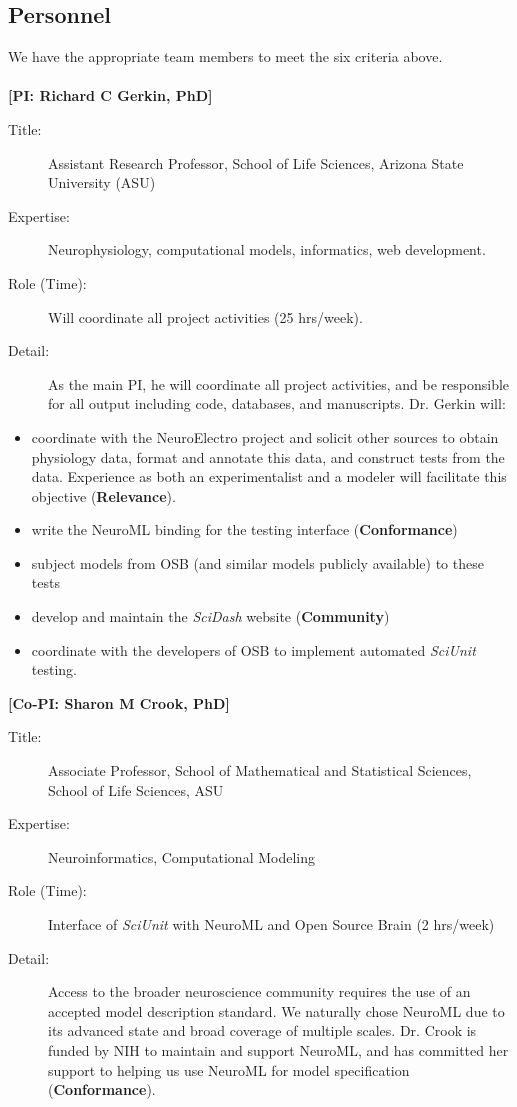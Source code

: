\documentclass[11pt,letterpaper]{article}
\begin{document}
\subsection{Personnel}
We have the appropriate team members to meet the six criteria above. 
\\
\\
\textbf{[PI: Richard C Gerkin, PhD]}
\begin{description}
\item[Title:] Assistant Research Professor, School of Life Sciences, Arizona State University (ASU)
\item[Expertise:] Neurophysiology, computational models, informatics, web development.   
\item[Role (Time):] Will coordinate all project activities (25 hrs/week).  
\item[Detail:] As the main PI, he will coordinate all project activities, and be responsible for all output including code, databases, and manuscripts. Dr. Gerkin will:
\end{description}
\begin{itemize}
\item coordinate with the NeuroElectro project and solicit other sources to obtain physiology data, format and annotate this data, and construct tests from the data.  Experience as both an experimentalist and a modeler will facilitate this objective (\textbf{Relevance}).   
\item write the NeuroML binding for the testing interface (\textbf{Conformance})
\item subject models from OSB (and similar models publicly available) to these tests 
\item develop and maintain the \textit{SciDash} website (\textbf{Community})
\item coordinate with the developers of OSB to implement automated \textit{SciUnit} testing.
\end{itemize}
\textbf{[Co-PI: Sharon M Crook, PhD]}
\begin{description}
\item[Title:] Associate Professor, School of Mathematical and Statistical Sciences, School of Life Sciences, ASU
\item[Expertise:] Neuroinformatics, Computational Modeling
\item[Role (Time):] Interface of \textit{SciUnit} with NeuroML and Open Source Brain (2 hrs/week)
\item[Detail:] Access to the broader neuroscience community requires the use of an accepted model description standard.  We naturally chose NeuroML due to its advanced state and broad coverage of multiple scales.  Dr. Crook is funded by NIH to maintain and support NeuroML, and has committed her support to helping us use NeuroML for model specification (\textbf{Conformance}).  
\end{description}
\end{document}
